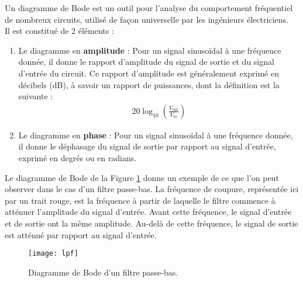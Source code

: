 Un diagramme de Bode est un outil pour l'analyse du comportement fréquentiel de nombreux circuits, utilisé de façon universelle par les ingénieurs électriciens.\\

Il est constitué de 2 éléments :
\begin{enumerate}
	\item Le diagramme en \textbf{amplitude} : Pour un signal sinusoïdal à une fréquence donnée, il donne le rapport d'amplitude du signal de sortie et du signal d'entrée du circuit. Ce rapport d'amplitude est généralement exprimé en décibels (dB), à savoir un rapport de puissances, dont la définition est la suivante : 
	\begin{align*}
		20 \log_{10}\left( \frac{V_{out}}{V_{in}}\right)
	\end{align*}
	\item Le diagramme en \textbf{phase} : Pour un signal sinusoïdal à une fréquence donnée, il donne le déphasage du signal de sortie par rapport au signal d'entrée, exprimé en degrés ou en radians. 
\end{enumerate}
\vspace{.25cm}

Le diagramme de Bode de la Figure \ref{fig3:lpf} donne un exemple de ce que l'on peut observer dans le cas d'un filtre passe-bas. La fréquence de coupure, représentée ici par un trait rouge, est la fréquence à partir de laquelle le filtre commence à atténuer l'amplitude du signal d'entrée. Avant cette fréquence, le signal d'entrée et de sortie ont la même amplitude. Au-delà de cette fréquence, le signal de sortie est atténué par rapport au signal d'entrée.

\begin{figure}[!ht]
	\centering
	\texttt{[image: lpf]}
	\caption{Diagramme de Bode d'un filtre passe-bas.}
	\label{fig3:lpf}
\end{figure}
